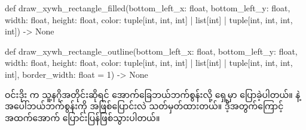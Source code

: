 %
\begin{py}
def draw_xywh_rectangle_filled(bottom_left_x: float,
                               bottom_left_y: float,
                               width: float,
                               height: float,
                               color: tuple[int, int, int] 
                                   | list[int] 
                                   | tuple[int, int, int, int]) -> None

def draw_xywh_rectangle_outline(bottom_left_x: float,
                                bottom_left_y: float,
                                width: float,
                                height: float,
                                color: tuple[int, int, int] 
                                    | list[int] 
                                    | tuple[int, int, int, int],
                                border_width: float = 1) -> None
\end{py}
%

 ဝင်းဒိုး  က သူ့နဂိုအတိုင်းဆိုရင် အောက်ခြေဘယ်ဘက်စွန်းလို့ ရှေ့မှာ ပြောခဲ့ပါတယ်။  နဲ့ အပေါ်ဘယ်ဘက်စွန်းကို  အဖြစ်ပြောင်းလဲ သတ်မှတ်ထားတယ်။ ဒီ့အတွက်ကြောင့် အထက်အောက် ပြောင်းပြန်ဖြစ်သွားပါတယ်။ 





\begin{figure}[tb!]
\caption{}
\label{fig:ch07rects}
\end{figure}

